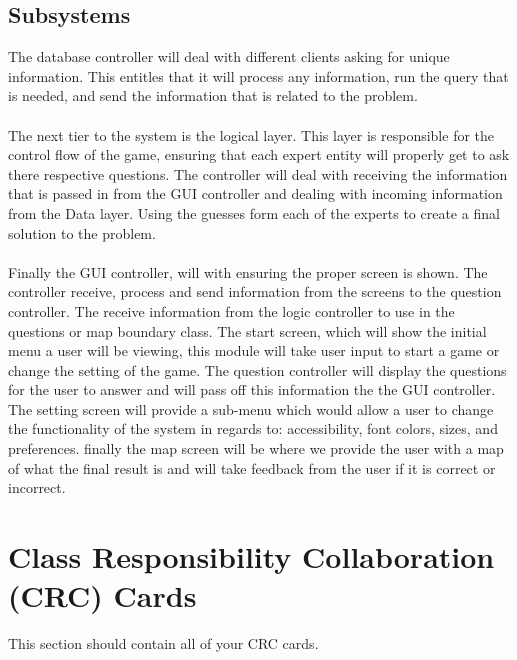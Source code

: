 \documentclass[titlepage]{article}
\begin{document}
\subsection{Subsystems}
\label{sub:subsystems}
The database controller will deal with different clients asking for unique information. This entitles that it will process any information, run the query that is needed, and send the information that is related to the problem. \\ \\
The next tier to the system is the logical layer. This layer is responsible for the control flow of the game, ensuring that each expert entity will properly get to ask there respective questions. The controller will deal with receiving the information that is passed in from the GUI controller and dealing with incoming information from the Data layer. Using the guesses form each of the experts to create a final solution to the problem.\\ \\
Finally the GUI controller, will with ensuring the proper screen is shown. The controller receive, process and send information from the screens to the question controller. The receive information from the logic controller to use in the questions or map boundary class. The start screen, which will show the initial menu a user will be viewing, this module will take user input to start a game or change the setting of the game. The question controller will display the questions for the user to answer and will pass off this information the the GUI controller. The setting screen will provide a sub-menu which would allow a user to change the functionality of the system in regards to: accessibility, font colors, sizes, and preferences. finally the map screen will be where we provide the user with a map of what the final result is and will take feedback from the user if it is correct or incorrect.

	
\newpage	
\section{Class Responsibility Collaboration (CRC) Cards}
\label{sec:class_responsibility_collaboration_crc_cards}
This section should contain all of your CRC cards.
	
\end{document}

